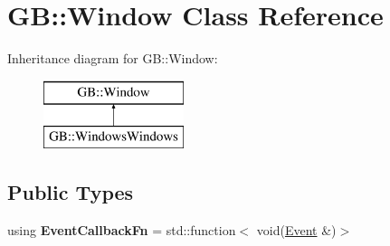 \hypertarget{class_g_b_1_1_window}{}\section{GB\+::Window Class Reference}
\label{class_g_b_1_1_window}
Inheritance diagram for GB\+::Window\+:\begin{figure}[H]
\begin{center}
\leavevmode
\includegraphics[height=2.000000cm]{class_g_b_1_1_window}
\end{center}
\end{figure}
\subsection*{Public Types}
\begin{DoxyCompactItemize}
\item 
\mbox{\label{class_g_b_1_1_window_ac71e4ad99a310931870ac93dd70b3859}} 
using {\bfseries Event\+Callback\+Fn} = std\+::function$<$ void(\mbox{\hyperlink{class_g_b_1_1_event}{Event}} \&)$>$
\end{DoxyCompactItemize}
